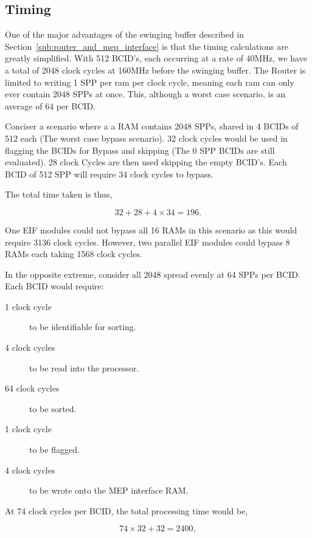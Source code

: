 	\subsection{Timing} %
	\label{sub:timing}
	
		One of the major advantages of the swinging buffer described in Section~\ref{sub:router_and_mep_interface} is that the timing calculations are greatly simplified.
		With 512 BCID's, each occurring at a rate of 40MHz, we have a total of 2048 clock cycles at 160MHz before the swinging buffer.
		The Router is limited to writing 1 SPP per ram per clock cycle, meaning each ram can only ever contain 2048 SPPs at once.
		This, although a worst case scenario, is an average of 64 per BCID.

		Conciser a scenario where a a RAM contains 2048 SPPs, shared in 4 BCIDs of 512 each (The worst case bypass scenario). 
		32 clock cycles would be used in flagging the BCIDs for Bypass and skipping (The 0 SPP BCIDs are still evaluated).
		28 clock Cycles are then used skipping the empty BCID's.
		Each BCID of 512 SPP will require 34 clock cycles to bypass.

		The total time taken is thus,

		\begin{equation}
			32 + 28 + 4 \times 34 = 196.
		\end{equation}

		One EIF modules could not bypass all 16 RAMs in this scenario as this would require 3136 clock cycles.
		However, two parallel EIF modules could bypass 8 RAMs each taking 1568 clock cycles.

		In the opposite extreme, consider all 2048 spread evenly at 64 SPPs per BCID.
		Each BCID would require:

		\begin{description}
			\item [1 clock cycle] to be identifiable for sorting.
			\item [4 clock cycles] to be read into the processor.
			\item [64 clock cycles] to be sorted.
			\item [1 clock cycle] to be flagged.
			\item [4 clock cycles] to be wrote onto the MEP interface RAM.
		\end{description}
		
		At 74 clock cycles per BCID, the total processing time would be,

		\begin{equation}
			74 \times 32 + 32 = 2400,
		\end{equation}

